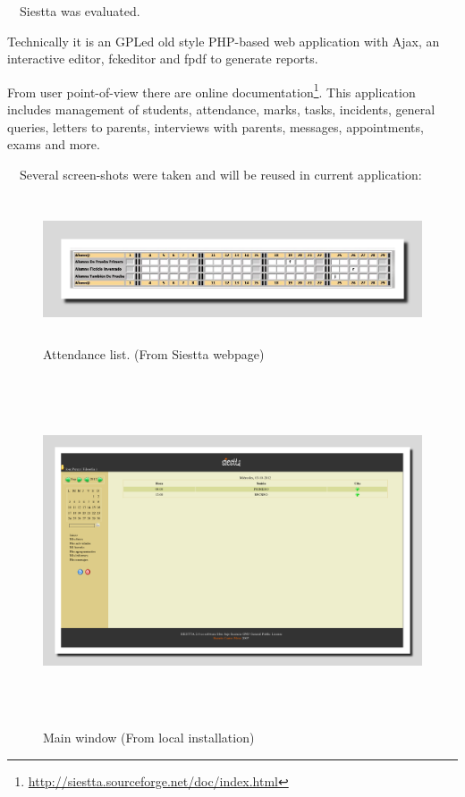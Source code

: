 \documentclass[a4paper]{article}
\begin{document}
\ \ Siestta was evaluated. 

Technically it is an GPL{\textquotesingle}ed old style PHP-based web
application with Ajax, an interactive editor, fckeditor and fpdf to
generate reports.

From user point-of-view there are online
documentation\footnote{\url{http://siestta.sourceforge.net/doc/index.html}}.
This application includes management of students, attendance, marks,
tasks, incidents, general queries, letters to parents, interviews with
parents, messages, appointments, exams and more.

\ \ Several screen-shots were taken and will be reused in current
application:



\begin{figure}
\centering
\begin{minipage}{17cm}

\includegraphics[width=17cm,height=4.314cm]{PhoneGapProjectMSWLMemory-img/PhoneGapProjectMSWLMemory-img2.png}
\caption[Attendance list. (From Siestta webpage)]{Attendance list. (From
Siestta webpage)}
\end{minipage}
\end{figure}


\begin{figure}
\centering
\includegraphics[width=17cm,height=10.351cm]{PhoneGapProjectMSWLMemory-img/PhoneGapProjectMSWLMemory-img3.png}
\caption[Main window (From local installation)]{Main window (From local
installation)}

\end{figure}
\end{document}
